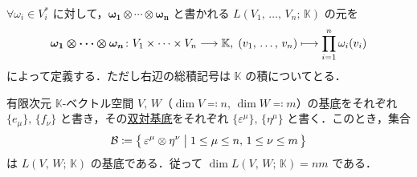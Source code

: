 \documentclass[geometry_main]{subfiles}
\begin{document}

$\forall \omega_i \in V_i^*$ に対して，$\bm{\omega_1 \otimes \cdots \otimes \omega_n}$ と書かれる $L(V_1,\, \dots,\, V_n;\, \mathbb{K})$ の元を
\begin{align}
	\bm{\omega_1 \otimes \cdots \otimes \omega_n} \colon V_1 \times \cdots \times V_n \longrightarrow \mathbb{K},\; (v_1,\, \dots,\, v_n) \longmapsto \prod_{i=1}^n \omega_i(v_i)
\end{align}
によって定義する．ただし右辺の総積記号は $\mathbb{K}$ の積についてとる．

\begin{myprop}[label=prop:basis-L]{}
	有限次元 $\mathbb{K}$-ベクトル空間 $V,\, W$（$\dim V \eqqcolon n,\, \dim W \eqqcolon m$）の基底をそれぞれ $\{e_\mu\},\, \{f_\nu\}$ と書き，その\hyperref[def.basisforDVS]{双対基底}をそれぞれ $\{\varepsilon^\mu\},\, \{\eta^\mu\}$ と書く．このとき，集合
	\begin{align}
		\mathcal{B} \coloneqq \bigl\{\, \varepsilon^\mu \otimes \eta^\nu \bigm| 1 \le \mu \le n,\, 1 \le \nu \le m \,\bigr\} 
	\end{align}
	は $L(V,\, W;\, \mathbb{K})$ の基底である．従って $\dim L(V,\, W;\, \mathbb{K}) = nm$ である．
\end{myprop}
\end{document}

